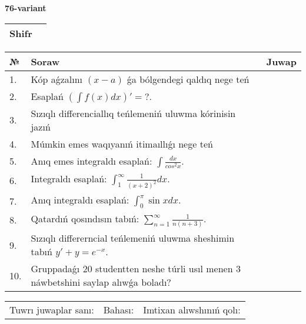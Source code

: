\documentclass{article}
\begin{document}
  \egroup
  
  \newpage
  
  
  \textbf{76-variant}\\
  
  \bgroup
  \def\arraystretch{1.6} %
  
  \begin{tabular}{|m{5.7cm}|m{9.5cm}|}
  \hline
  Shifr & \\
  \hline
  \end{tabular}
  
  \vspace{1cm}
  
  \begin{tabular}{|m{0.7cm}|m{10cm}|m{4cm}|}
  \hline
  № & Soraw & Juwap \\
  \hline
  1. & Kóp aǵzalını \((x - a)\) ǵa bólgendegi qaldıq nege teń &  \\
  \hline
  2. & Esaplań \(\left( \int{f(x)dx} \right)' = ?\). &  \\
  \hline
  3. & Sızıqlı differenciallıq teńlemeniń uluwma kórinisin jazıń &  \\
  \hline
  4. & Múmkin emes waqıyanıń itimaıllıǵı nege teń &  \\
  \hline
  5. & Anıq emes integraldı esaplań: \(\int\frac{dx}{cos^2 x}\). &  \\
  \hline
  6. & Integraldı esaplań: \(\int_{1}^{\infty}{\frac{1}{(x + 2)^2 }dx}\). &  \\
  \hline
  7. & Anıq integraldı esaplań: \(\int_{0}^{\pi}{\sin xdx}\). &  \\
  \hline
  8. & Qatardıń qosındısın tabıń: \(\sum_{n = 1}^{\infty}\frac{1}{n(n + 3)}\). &  \\
  \hline
  9. & Sızıqlı differerncial teńlemeniń uluwma sheshimin tabıń \(y' + y = e^{- x}\). &  \\
  \hline
  10. & Gruppadaǵı 20 studentten neshe túrli usıl menen 3 náwbetshini saylap alıwǵa boladı? &  \\
  \hline
  \end{tabular}
  
  \vspace{1cm}
  
  \begin{tabular}{lll}
  Tuwrı juwaplar sanı: \underline{\hspace{1.5cm}} & 
  Bahası: \underline{\hspace{1.5cm}} & 
  Imtixan alıwshınıń qolı: \underline{\hspace{2cm}} \\
  \end{tabular}
  
\end{document}
